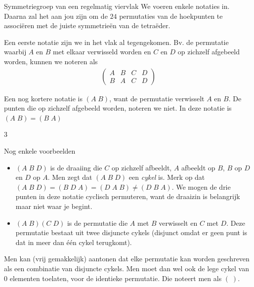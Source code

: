 \begin{lesactiviteit}{Symmetriegroep van een regelmatig viervlak}
 We voeren enkele notaties in. Daarna zal het aan jou zijn om de $24$ permutaties van de hoekpunten te associëren met de juiste symmetrieën van de tetraëder.
 
 Een eerste notatie zijn we in het vlak al tegengekomen. Bv. de permutatie waarbij $A$ en $B$ met elkaar verwisseld worden en $C$ en $D$ op zichzelf afgebeeld worden, kunnen we noteren als
    \begin{align*}
    \left( \begin{matrix}
    A&B&C&D\\
    B&A&C&D
    \end{matrix}
    \right)
    \end{align*}
 
Een nog kortere notatie is $(A\;B)$, want de permutatie verwisselt $A$ en $B$. De punten die op zichzelf afgebeeld worden, noteren we niet. In deze notatie is $(A\;B)=(B\;A)$

\begin{multicols}{3}


\end{multicols}

Nog enkele voorbeelden 

\begin{itemize}

    \item $(A\;B\;D)$ is de draaiing die $C$ op zichzelf afbeeldt, $A$ afbeeldt op $B$, $B$ op $D$ en $D$ op $A$. Men zegt dat $(A\;B\;D)$ een \emph{cykel} is. Merk op dat $(A\;B\;D)=(B\;D\;A)=(D\;A\;B)\ne(D\;B\;A)$. We mogen de drie punten in deze notatie cyclisch permuteren, want de draaizin is belangrijk maar niet waar je begint.
    
    \item $(A\;B)(C\;D)$ is de permutatie die $A$ met $B$ verwisselt en $C$ met $D$. Deze permutatie bestaat uit twee disjuncte cykels (disjunct omdat er geen punt is dat in meer dan één cykel terugkomt).

\end{itemize}

 Men kan (vrij gemakkelijk) aantonen dat elke permutatie kan worden geschreven als een combinatie van disjuncte cykels. Men moet dan wel ook de lege cykel van $0$ elementen toelaten, voor de identieke permutatie. Die noteert men als $(\;)$.
 
 \begin{vraagenantwoord}[resume]
 

\end{vraagenantwoord}
\end{lesactiviteit}
